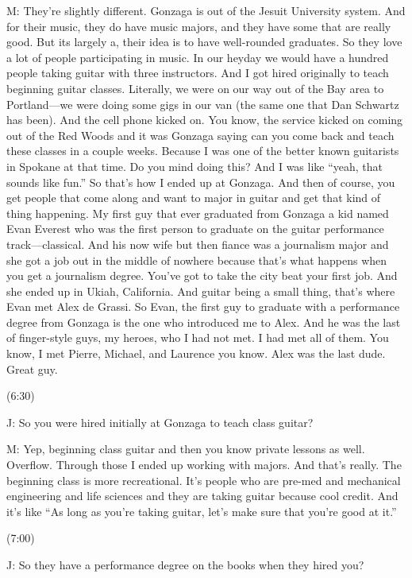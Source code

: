 \documentclass[11pt]{article}
\begin{document}
M: They're slightly different. Gonzaga is out of the Jesuit University system. And for their music, they do have music majors, and they have some that are really good.  But its largely a, their idea is to have well-rounded graduates. So they love a lot of people participating in music. In our heyday we would have a hundred people taking guitar with three instructors. And I got hired originally to teach beginning guitar classes. Literally, we were on our way out of the Bay area to Portland—we were doing some gigs in our van (the same one that Dan Schwartz has been). And the cell phone kicked on. You know, the service kicked on coming out of the Red Woods and it was Gonzaga saying can you come back and teach these classes in a couple weeks. Because I was one of the better known guitarists in Spokane at that time. Do you mind doing this? And I was like ``yeah, that sounds like fun.'' So that's how I ended up at Gonzaga. And then of course, you get people that come along and want to major in guitar and get that kind of thing happening. My first guy that ever graduated from Gonzaga a kid named Evan Everest who was the first person to graduate on the guitar performance track—classical. And his now wife but then fiance was a journalism major and she got a job out in the middle of nowhere because that's what happens when you get a journalism degree.  You've got to take the city beat your first job. And she ended up in Ukiah, California. And guitar being a small thing, that's where Evan met Alex de Grassi. So Evan, the first guy to graduate with a performance degree from Gonzaga is the one who introduced me to Alex. And he was the last of finger-style guys, my heroes, who I had not met. I had met all of them. You know, I met Pierre, Michael, and Laurence you know. Alex was the last dude. Great guy.

(6:30)

J: So you were hired initially at Gonzaga to teach class guitar?

M: Yep, beginning class guitar and then you know private lessons as well. Overflow. Through those I ended up working with majors. And that's really. The beginning class is more recreational. It's people who are pre-med and mechanical engineering and life sciences and they are taking guitar because cool credit. And it's like ``As long as you're taking guitar, let's make sure that you're good at it.''

(7:00)

J: So they have a performance degree on the books when they hired you?
\end{document}
